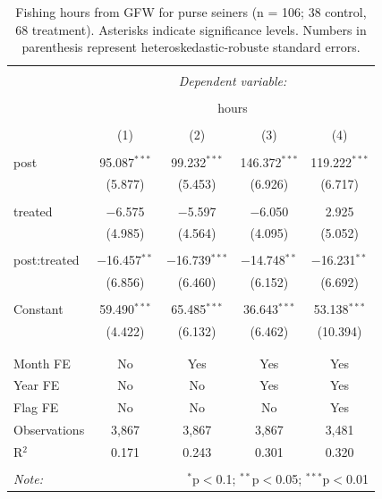 \documentclass[12pt,]{article}
\begin{document}
\begin{table}[!htbp] \centering 
  \caption{\label{tab:purse_old}Fishing hours from GFW for purse seiners (n = 106; 38 control, 68 treatment). Asterisks indicate significance levels. Numbers in parenthesis represent heteroskedastic-robuste standard errors.} 
  \label{} 
\begin{tabular}{@{\extracolsep{5pt}}lcccc} 
\\[-1.8ex]\hline 
\hline \\[-1.8ex] 
 & \multicolumn{4}{c}{\textit{Dependent variable:}} \\ 
\cline{2-5} 
\\[-1.8ex] & \multicolumn{4}{c}{hours} \\ 
\\[-1.8ex] & (1) & (2) & (3) & (4)\\ 
\hline \\[-1.8ex] 
 post & 95.087$^{***}$ & 99.232$^{***}$ & 146.372$^{***}$ & 119.222$^{***}$ \\ 
  & (5.877) & (5.453) & (6.926) & (6.717) \\ 
  & & & & \\ 
 treated & $-$6.575 & $-$5.597 & $-$6.050 & 2.925 \\ 
  & (4.985) & (4.564) & (4.095) & (5.052) \\ 
  & & & & \\ 
 post:treated & $-$16.457$^{**}$ & $-$16.739$^{***}$ & $-$14.748$^{**}$ & $-$16.231$^{**}$ \\ 
  & (6.856) & (6.460) & (6.152) & (6.692) \\ 
  & & & & \\ 
 Constant & 59.490$^{***}$ & 65.485$^{***}$ & 36.643$^{***}$ & 53.138$^{***}$ \\ 
  & (4.422) & (6.132) & (6.462) & (10.394) \\ 
  & & & & \\ 
\hline \\[-1.8ex] 
Month FE & No & Yes & Yes & Yes \\ 
Year FE & No & No & Yes & Yes \\ 
Flag FE & No & No & No & Yes \\ 
Observations & 3,867 & 3,867 & 3,867 & 3,481 \\ 
R$^{2}$ & 0.171 & 0.243 & 0.301 & 0.320 \\ 
\hline 
\hline \\[-1.8ex] 
\textit{Note:}  & \multicolumn{4}{r}{$^{*}$p$<$0.1; $^{**}$p$<$0.05; $^{***}$p$<$0.01} \\ 
\end{tabular} 
\end{table}
\end{document}
